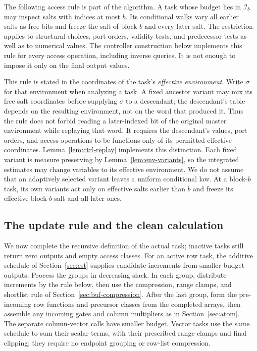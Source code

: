 The following access rule is part of the algorithm.  A task whose budget
lies in $\mathcal I_b$ may inspect salts with indices at most $b$.  Its
conditional walks vary all earlier salts as free bits and freeze the salt
of block $b$ and every later salt.  The restriction applies to structural
choices, port orders, validity tests, and predecessor tests as well as to
numerical values.  The controller construction below implements this rule
for every access operation, including inverse queries.  It is not enough
to impose it only on the final output values.

This rule is stated in the coordinates of the task's \emph{effective
environment}.  Write $\sigma$ for that environment when analyzing a
task.  A fixed ancestor variant may mix its free salt coordinates before
supplying $\sigma$ to a descendant; the descendant's table depends on
the resulting environment, not on the word that produced it.  Thus the
rule does not forbid reading a later-indexed bit of the original master
environment while replaying that word.  It requires the descendant's
values, port orders, and access operations to be functions only of
its permitted effective coordinates.  Lemma~\ref{lem:ctrl-replay}
implements this distinction.  Each fixed variant is measure preserving
by Lemma~\ref{lem:env-variants}, so the integrated estimates may change
variables to its effective environment.  We do not assume that an
adaptively selected variant leaves a uniform conditional law.  At a
block-$b$ task, its own variants act only on effective salts earlier
than $b$ and freeze its effective block-$b$ salt and all later ones.

\subsection{The update rule and the clean calculation}

We now complete the recursive definition of the actual task; inactive
tasks still return zero outputs and empty access classes.  For an active
row task, the additive schedule of Section~\ref{sec:est} supplies
candidate increments from smaller-budget outputs.  Process the groups in
decreasing slack.  In each group, distribute increments by the rule below,
then use the compression, range clamps, and shortlist rule of
Section~\ref{sec:buf-compression}.  After the last group, form the
pre-incoming row functions and precursor classes from the completed arrays,
then assemble any incoming gates and column multipliers as in
Section~\ref{sec:atom}.  The separate column-vector calls have smaller
budget.  Vector tasks use the same schedule to sum their scalar terms,
with their prescribed range clamps and final clipping; they require no
endpoint grouping or row-list compression.


